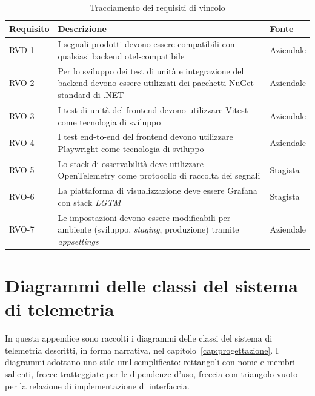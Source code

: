\begin{longtable}{|C{2cm}|C{8.5cm}|C{2.5cm}|}
      \caption{Tracciamento dei requisiti di vincolo} \label{tab:requisiti-vincolo}                                                                                    \\
      \hline
      \textbf{Requisito} & \textbf{Descrizione}                                                                                                       & \textbf{Fonte} \\
      \hline
      RVD-1              & I segnali prodotti devono essere compatibili con qualsiasi backend \gls{otel}-compatibile                                  & Aziendale      \\
      \hline
      RVO-2              & Per lo sviluppo dei test di unità e integrazione del backend devono essere utilizzati dei pacchetti NuGet standard di .NET & Aziendale      \\
      \hline
      RVO-3              & I test di unità del frontend devono utilizzare Vitest come tecnologia di sviluppo                                          & Aziendale      \\
      \hline
      RVO-4              & I test end-to-end del frontend devono utilizzare Playwright come tecnologia di sviluppo                                    & Aziendale      \\
      \hline
      RVO-5              & Lo stack di osservabilità deve utilizzare OpenTelemetry come protocollo di raccolta dei segnali                            & Stagista       \\
      \hline
      RVO-6              & La piattaforma di visualizzazione deve essere Grafana con stack \emph{LGTM}                                                & Stagista       \\
      \hline
      RVO-7              & Le impostazioni devono essere modificabili per ambiente (sviluppo, \emph{staging}, produzione) tramite \emph{appsettings}  & Aziendale      \\
      \hline
\end{longtable}

\chapter{Diagrammi delle classi del sistema di telemetria}
\label{app:diagrammi-classi}

In questa appendice sono raccolti i diagrammi delle classi del sistema di
telemetria descritti, in forma narrativa, nel capitolo~\ref{cap:progettazione}.
I diagrammi adottano uno stile \gls{uml} semplificato: rettangoli con nome e
membri salienti, frecce tratteggiate per le dipendenze d'uso, freccia con
triangolo vuoto per la relazione di implementazione di interfaccia.

